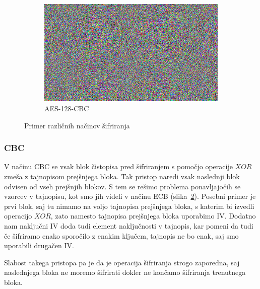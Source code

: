 \documentclass[12pt,a4paper,openany]{book}
\begin{document}
\begin{figure}[ht!]
\begin{subfigure}[b]{0.3\textwidth}
    \includegraphics[width=\textwidth]{images/LogoFRI_cbc}
    \caption{AES-128-CBC}
\label{fig:logoFRICBC}
  \end{subfigure}
  \caption{Primer različnih načinov šifriranja}
\label{fig:ecbbad}
\end{figure}


\subsubsection{CBC}
\label{subs:CBC}

V načinu \Gls{CBC} se vsak blok čistopisa pred šifriranjem s pomočjo operacije $XOR$ zmeša z tajnopisom prejšnjega bloka. Tak pristop naredi vsak naslednji blok odvisen od vseh prejšnjih blokov. S tem se rešimo problema ponavljajočih se vzorcev v tajnopisu, kot smo jih videli v načinu \acrshort{ECB} (slika~\ref{fig:ecbbad}). Posebni primer je prvi blok, saj tu nimamo na voljo tajnopisa prejšnjega bloka, s katerim bi izvedli operacijo $XOR$, zato namesto tajnopisa prejšnjega bloka uporabimo \acrfull{IV}. Dodatno nam naključni \gls{IV} doda tudi element naključnosti v tajnopis, kar pomeni da tudi če šifriramo enako sporočilo z enakim ključem, tajnopis ne bo enak, saj smo uporabili drugačen \gls{IV}.

Slabost takega pristopa pa je da je operacija šifriranja strogo zaporedna, saj naslednjega bloka ne moremo šifrirati dokler ne končamo šifriranja trenutnega bloka.
\end{document}
